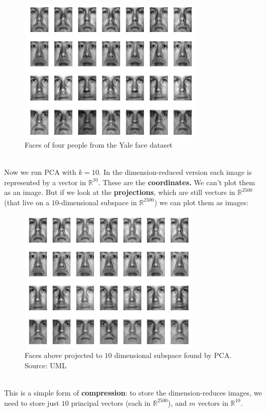 \documentclass[11pt]{article}
\newcommand{\R}{\ensuremath{\mathbb{R}}}
\begin{document}
\begin{figure}[H]
      \centering
      \includegraphics[height=2.7in]{pca_faces_before.jpeg}        
      \caption{Faces of four people from the Yale face dataset}
    \end{figure}
~\\
    Now we run PCA with $k=10$. In the dimension-reduced version
    each image is represented by a vector in $\R^{10}$. These are the {\bf
    coordinates.} We can't plot them as an image. But if we look at the {\bf
    projections}, which are still vectors in $\R^{2500}$ (that live on a
    $10$-dimensional subspace in $\R^{2500}$) we can plot them as images:
\begin{figure}[H]
      \centering
      \includegraphics[height=2.7in]{pca_faces_after.jpeg}        
      \caption{Faces above projected to $10$ dimensional subspace found by PCA.
      Source: UML}
    \end{figure}
~\\
This is a simple form of {\bf compression}: to store the dimension-reduces
images, we need to store just $10$ principal vectors 
(each in $\R^{2500}$), and $m$ vectors in $\R^{10}$.
\\~\\
\end{document}
